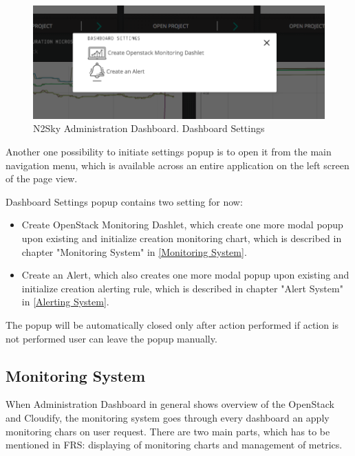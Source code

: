 \begin{figure}[htbp]
\begin{center}
  \includegraphics[width=\linewidth]{components/4/pics/dashboard_settings.png}
  \caption{N2Sky Administration Dashboard. Dashboard Settings}
  \label{fig:dashboard_settings}
\end{center}
\end{figure}

Another one possibility to initiate settings popup is to open it from the main navigation menu, which is available across an entire application on the left screen of the page view. 

Dashboard Settings popup contains two setting for now:
\begin{itemize}
\item Create OpenStack Monitoring Dashlet, which create one more modal popup upon existing and initialize creation monitoring chart, which is described in chapter "Monitoring System" in \autoref{Monitoring System}.
\item Create an Alert, which also creates one more modal popup upon existing and initialize creation alerting rule, which is described in chapter "Alert System" in \autoref{Alerting System}.
\end{itemize}

The popup will be automatically closed only after action performed if action is not performed user can leave the popup manually.



\subsection{Monitoring System}\label{Monitoring System}

When Administration Dashboard in general shows overview of the OpenStack and Cloudify, the monitoring system goes through every dashboard an apply monitoring chars on user request. There are two main parts, which has to be mentioned in FRS: displaying of monitoring charts and management of metrics.
 

